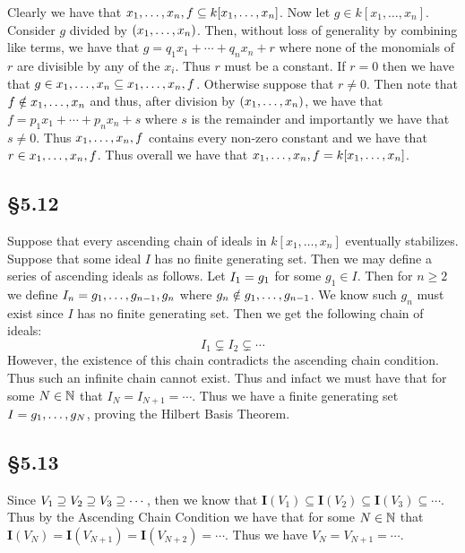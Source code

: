 \documentclass[letterpaper]{article}
\begin{document}
Clearly we have that $\gen{x_{1}, \ldots, x_{n}, f} \subseteq k[x_{1}, \ldots, x_{n}]$. Now let $g \in k[x_{1}, \ldots, x_{n}]$. Consider $g$ divided by $\pqty{x_{1}, \ldots, x_{n}}$. Then, without loss of generality by combining like terms, we have that $g = q_{1}x_{1} + \cdots + q_{n}x_{n} + r$ where none of the monomials of $r$ are divisible by any of the $x_{i}$. Thus $r$ must be a constant. If $r = 0$ then we have that $g \in \gen{x_{1}, \ldots, x_{n}} \subseteq \gen{x_{1}, \ldots, x_{n}, f}$. Otherwise suppose that $r \neq 0$. Then note that $f \notin \gen{x_{1}, \ldots, x_{n}}$ and thus, after division by $\pqty{x_{1}, \ldots, x_{n}}$, we have that $f = p_{1}x_{1} + \cdots + p_{n}x_{n} + s$ where $s$ is the remainder and importantly we have that $s \neq 0$. Thus $\gen{x_{1}, \ldots, x_{n}, f}$ contains every non-zero constant and we have that $r \in \gen{x_{1}, \ldots, x_{n}, f}$. Thus overall we have that $\gen{x_{1}, \ldots, x_{n}, f} = k[x_{1}, \ldots, x_{n}]$.

\subsection{\S 5.12}

Suppose that every ascending chain of ideals in $k[x_{1}, \ldots, x_{n}]$ eventually stabilizes. Suppose that some ideal $I$ has no finite generating set. Then we may define a series of ascending ideals as follows. Let $I_{1} = \gen{g_{1}}$ for some $g_{1} \in I$. Then for $n \geq 2$ we define $I_{n} = \gen{g_{1}, \ldots, g_{n - 1}, g_{n}}$ where $g_{n} \notin \gen{g_{1}, \ldots, g_{n - 1}}$. We know such $g_{n}$ must exist since $I$ has no finite generating set. Then we get the following chain of ideals:
\[
  I_{1} \subsetneq I_{2} \subsetneq \cdots
\]
However, the existence of this chain contradicts the ascending chain condition. Thus such an infinite chain cannot exist. Thus and infact we must have that for some $N \in \mathbb{N}$ that $I_{N} = I_{N + 1} = \cdots$. Thus we have a finite generating set $I = \gen{g_{1}, \ldots, g_{N}}$, proving the Hilbert Basis Theorem.

\subsection{\S 5.13}

Since $V_{1} \supseteq V_{2} \supseteq V_{3} \supseteq \cdots$, then we know that $\textbf{I}(V_{1}) \subseteq \textbf{I}(V_{2}) \subseteq \textbf{I}(V_{3}) \subseteq \cdots$. Thus by the Ascending Chain Condition we have that for some $N \in \mathbb{N}$ that $\textbf{I}(V_{N}) = \textbf{I}(V_{N + 1}) = \textbf{I}(V_{N + 2}) = \cdots$. Thus we have $V_{N} = V_{N + 1} = \cdots$.
\end{document}
